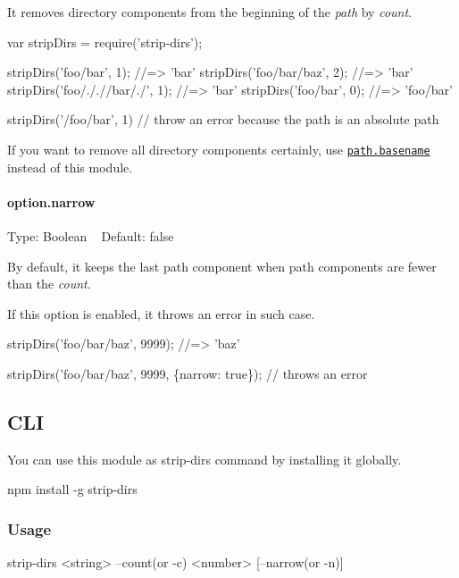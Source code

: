 It removes directory components from the beginning of the {\itshape path} by {\itshape count}.


\begin{DoxyCode}
var stripDirs = require('strip-dirs');

stripDirs('foo/bar', 1); //=> 'bar'
stripDirs('foo/bar/baz', 2); //=> 'bar'
stripDirs('foo/././/bar/./', 1); //=> 'bar'
stripDirs('foo/bar', 0); //=> 'foo/bar'

stripDirs('/foo/bar', 1) // throw an error because the path is an absolute path
\end{DoxyCode}


If you want to remove all directory components certainly, use \href{http://nodejs.org/api/path.html#path_path_basename_p_ext}{\tt {\ttfamily path.\+basename}} instead of this module.

\paragraph*{option.\+narrow}

Type\+: {\ttfamily Boolean} ~\newline
Default\+: {\ttfamily false}

By default, it keeps the last path component when path components are fewer than the {\itshape count}.

If this option is enabled, it throws an error in such case.


\begin{DoxyCode}
stripDirs('foo/bar/baz', 9999); //=> 'baz'

stripDirs('foo/bar/baz', 9999, \{narrow: true\}); // throws an error
\end{DoxyCode}


\subsection*{C\+LI}

You can use this module as {\ttfamily strip-\/dirs} command by installing it globally.


\begin{DoxyCode}
npm install -g strip-dirs
\end{DoxyCode}


\subsubsection*{Usage}


\begin{DoxyCode}
strip-dirs <string> --count(or -c) <number> [--narrow(or -n)]
\end{DoxyCode}


